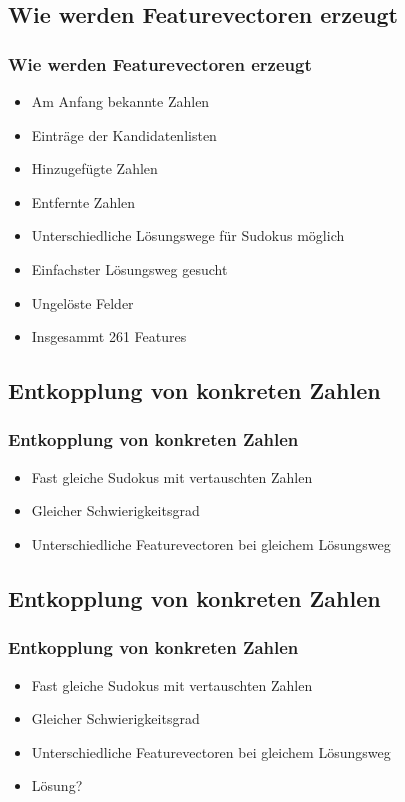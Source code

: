 \documentclass[accentcolor=tud6b,colorbacktitle,inverttitle,landscape,german,presentation,t]{tudbeamer}
\begin{document}
	\subsection{Wie werden Featurevectoren erzeugt}
		\begin{frame}
		\frametitle{Wie werden Featurevectoren erzeugt}
		\begin{itemize}
		\item Am Anfang bekannte Zahlen
		\item Einträge der Kandidatenlisten
		\item Hinzugefügte Zahlen
		\item Entfernte Zahlen
		\item Unterschiedliche Lösungswege für Sudokus möglich
		\item Einfachster Lösungsweg gesucht
		\item Ungelöste Felder
		\item Insgesammt 261 Features
		\end{itemize}
		\end{frame}

	\subsection{Entkopplung von konkreten Zahlen}
		\begin{frame}
		\frametitle{Entkopplung von konkreten Zahlen}
		\begin{itemize}
		\item Fast gleiche Sudokus mit vertauschten Zahlen
		\item Gleicher Schwierigkeitsgrad
		\item Unterschiedliche Featurevectoren bei gleichem Lösungsweg
		\end{itemize}
		\end{frame}
	\subsection{Entkopplung von konkreten Zahlen}
		\begin{frame}
		\frametitle{Entkopplung von konkreten Zahlen}
		\begin{itemize}
		\item Fast gleiche Sudokus mit vertauschten Zahlen
		\item Gleicher Schwierigkeitsgrad
		\item Unterschiedliche Featurevectoren bei gleichem Lösungsweg
		\item Lösung?
		\end{itemize}
		\end{frame}
\end{document}
